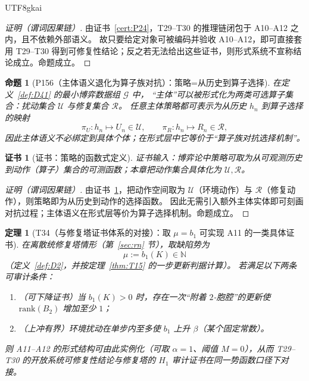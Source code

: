 \documentclass[12pt]{article}
\newtheorem{theorem}{定理}[section]
\newtheorem{proposition}{命题}[section]
\newtheorem{Certificate}{证书}[section]
\begin{document}
\begin{CJK*}{UTF8}{gkai}
\begin{proof}[证明（谓词因果链）]
由证书~\ref{cert:P24}，T29--T30 的推理链闭包于 A10--A12 之内，且不依赖外部语义。
故只要给定对象可被编码并验收 A10--A12，即可直接套用 T29--T30 得到可修复性结论；反之若无法给出这些证书，则形式系统不宣称结论成立。命题成立。
\end{proof}

\begin{proposition}[P156（主体语义退化为算子族对抗）：策略=从历史到算子选择]
\label{prop:P25}
在定义~\ref{def:D41} 的最小博弈数据组 $\mathcal G$ 中，
“主体”可以被形式化为两类可选算子集合：扰动集合 $\mathcal U$ 与修复集合 $\mathcal R$。
任意主体策略都可表示为从历史 $h_n$ 到算子选择的映射
\[
\pi_U:h_n\mapsto U_n\in\mathcal U,\qquad
\pi_R:h_n\mapsto R_n\in\mathcal R,
\]
因此主体语义不必绑定到具体个体；在形式层中它等价于“算子族对抗选择机制”。
\end{proposition}

\begin{Certificate}[证书：策略的函数式定义]
\label{cert:P25}
证书输入：博弈论中策略可取为从可观测历史到动作（算子）集合的可测函数；本章把动作集合具体化为 $\mathcal U,\mathcal R$。
\end{Certificate}

\begin{proof}[证明（谓词因果链）]
由证书~\ref{cert:P25}，把动作空间取为 $\mathcal U$（环境动作）与 $\mathcal R$（修复动作），则策略即为从历史到动作的选择函数。
因此无需引入额外主体实体即可刻画对抗过程；主体语义在形式层等价为算子选择机制。命题成立。
\end{proof}

\begin{theorem}[T34（与修复塔证书体系的对接）：取 $\mu=b_1$ 可实现 A11 的一类具体证书]
\label{thm:T34}
在离散统修复塔情形（第~\ref{sec:rn} 节），取缺陷势为
\[
\mu:=b_1(K)\in\mathbb N
\]
（定义~\ref{def:D2}，并按定理~\ref{thm:T15} 的一步更新判据计算）。
若满足以下两条可审计条件：
\begin{enumerate}
\item （可下降证书）当 $b_1(K)>0$ 时，存在一次“附着 $2$-胞腔”的更新使 $\mathrm{rank}(B_2)$ 增加至少 $1$；
\item （上冲有界）环境扰动在单步内至多使 $b_1$ 上升 $\beta$（某个固定常数）。
\end{enumerate}
则 A11--A12 的形式结构可由此实例化（可取 $\alpha=1$、阈值 $M=0$），从而 T29--T30 的开放系统可修复性结论与修复塔的 $H_1$ 审计证书在同一势函数口径下对接。
\end{theorem}


\end{CJK*}
\end{document}
